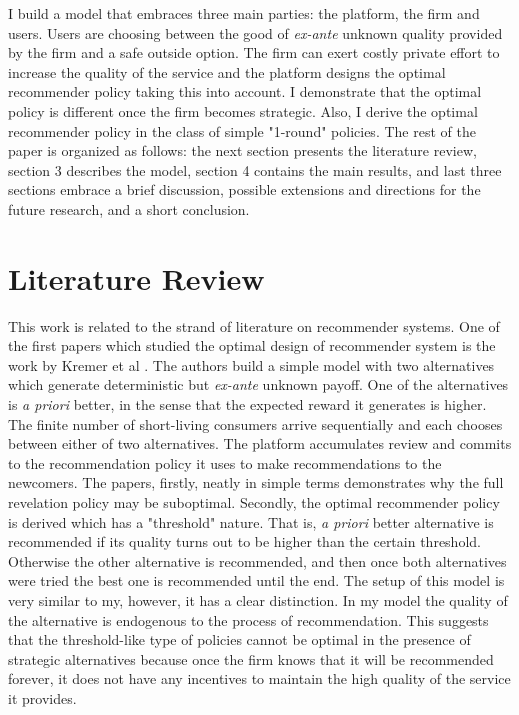 \documentclass[a4paper]{article}
\begin{document}
	
	
	
	I build a model that embraces three main parties: the platform, the firm and users. Users are choosing between the good of \textit{ex-ante} unknown quality provided by the firm and a safe outside option. The firm can exert costly private effort to increase the quality of the service and the platform designs the optimal recommender policy taking this into account. I demonstrate that the optimal policy is different once the firm becomes strategic. Also, I derive the optimal recommender policy in the class of simple "1-round" policies. The rest of the paper is organized as follows: the next section presents the literature review, section 3 describes the model, section 4 contains the main results, and last three sections embrace a brief discussion, possible extensions and directions for the future research, and a short conclusion.
	\section{Literature Review}
	This work is related to the strand of literature on recommender systems. One of the first papers which studied the optimal design of recommender system is the work by Kremer et al \cite{kremer2014}. The authors build a simple model with two alternatives which generate deterministic but \textit{ex-ante} unknown payoff. One of the alternatives is \textit{a priori} better, in the sense that the expected reward it generates is higher. The finite number of short-living consumers arrive sequentially and each chooses between either of two alternatives. The platform accumulates review and commits to the recommendation policy it uses to make recommendations to the newcomers. The papers, firstly, neatly in simple terms demonstrates why the full revelation policy may be suboptimal. Secondly, the optimal recommender policy is derived which has a "threshold" nature. That is, \textit{a priori} better alternative is recommended if its quality turns out to be higher than the certain threshold. Otherwise the other alternative is recommended, and then once both alternatives were tried the best one is recommended until the end. The setup of this model is very similar to my, however, it has a clear distinction. In my model the quality of the alternative is endogenous to the process of recommendation. This suggests that the threshold-like type of policies cannot be optimal in the presence of strategic alternatives because once the firm knows that it will be recommended forever, it does not have any incentives to maintain the high quality of the service it provides. 
	
\end{document}
